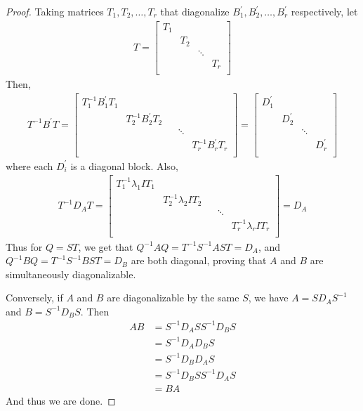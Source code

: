 \documentclass[12pt]{article}
\theoremstyle{definition}
\theoremstyle{remark}
\begin{document}
\begin{proof}
  Taking matrices $T_1 , T_2 , \ldots , T_r$ that
  diagonalize $B^\prime_1 ,  B^\prime_2 , \ldots , B^\prime_r$
  respectively, let
  \begin{align*}
    T =
    \begin{bmatrix}%
      T_1&  &  &  \\
      & T_2 &  &  \\
      &  & \ddots &  \\
      &  &  & T_r \\
    \end{bmatrix}
  \end{align*}
  Then,
  \begin{align*}
    T^{-1} B^\prime T =
    \begin{bmatrix}
      T_1^{-1}B_1^\prime T_1 &  &  & \\
      & T_2^{-1}B_2^\prime T_2 &   & \\
      &  &  & \ddots  & \\
      &  & &   & T_r^{-1} B_r^\prime T_r \\
    \end{bmatrix} =
    \begin{bmatrix}%
      D_1^\prime&  &  &  \\
      &  D_2^\prime&  &  \\
      &  &  \ddots&  \\
      &  &  & D_r^\prime \\
    \end{bmatrix}
  \end{align*} where each $D_i^\prime$ is a diagonal block.
  Also,
  \begin{align*}
    T^{-1} D_A T =
    \begin{bmatrix}
      T_1^{-1}\lambda_1 I T_1 &  &  & \\
      & T_2^{-1}\lambda_2 IT_2 &   & \\
      &  &  & \ddots  & \\
      &  & &   & T_r^{-1} \lambda_r I T_r \\
    \end{bmatrix} = D_A
  \end{align*}
  Thus for $Q = ST$, we get that $Q^{-1}AQ =  T^{-1} S^{-1} A S T = D_A$,
  and $Q^{-1}BQ = T^{-1} S^{-1}B ST = D_B $ are both diagonal,
  proving that $A$ and $B$ are simultaneously diagonalizable.

  Conversely, if $A$ and $B$ are diagonalizable by the same $S$, we have $A
  = SD_AS^{-1}$ and $B = S^{-1}D_BS$. Then
  \begin{align*}
    AB &= S^{-1}D_ASS^{-1}D_BS \\
    &= S^{-1}D_AD_B S \\
    &= S^{-1}D_BD_AS \\
    &=S^{-1}D_BSS^{-1}D_AS \\
    &= BA
  \end{align*}
  And thus we are done.
\end{proof}
\end{document}
